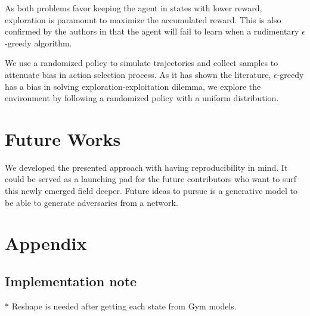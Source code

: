 \documentclass{article}
\begin{document}
    As both problems favor keeping the agent in states with lower reward, exploration is paramount to maximize the
    accumulated reward.
    This is also confirmed by the authors in \cite{Strehl2004} that the agent will fail to learn when a rudimentary
    $\epsilon$-greedy algorithm.

    We use a randomized policy to simulate trajectories and collect samples to attenuate bias in action selection
    process.
    As it has shown the literature, $\epsilon$-greedy has a bias in solving exploration-exploitation dilemma, we
    explore the environment by following a randomized policy with a uniform distribution.

    \section{Future Works}
    We developed the presented approach with having reproducibility in mind. It could be served as a launching pad for the future contributors who want to surf this newly emerged field deeper. Future ideas to pursue is a generative model to be able to generate adversaries from a network.

    \section*{Appendix}

    \subsection{Implementation note}
    * Reshape is needed after getting each state from Gym models.


    
    




\end{document}
